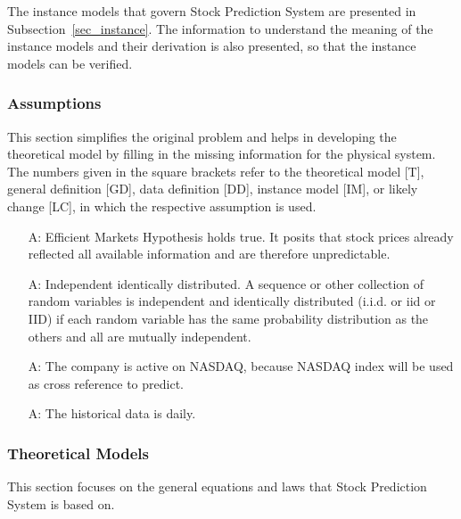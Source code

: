 \documentclass[12pt]{article}
\newcounter{assumpnum} %
\newcommand{\progname}{Stock Prediction System} %
\begin{document}
The instance models that govern \progname{} are presented in
Subsection~\ref{sec_instance}. The information to understand the meaning of the
instance models and their derivation is also presented, so that the instance
models can be verified.

\subsubsection{Assumptions}

This section simplifies the original problem and helps in developing the
theoretical model by filling in the missing information for the physical
system. The numbers given in the square brackets refer to the theoretical model
[T], general definition [GD], data definition [DD], instance model [IM], or
likely change [LC], in which the respective assumption is used.

\begin{itemize}

\item[A\refstepcounter{assumpnum}\theassumpnum \label{Ass1}:]
Efficient Markets Hypothesis holds true. It posits that stock prices already reflected all available information and are therefore unpredictable. 

\item[A\refstepcounter{assumpnum}\theassumpnum \label{Ass2}:]
Independent identically distributed. A sequence or other collection of random variables is independent and identically distributed (i.i.d. or iid or IID) if each random variable has the same probability distribution as the others and all are mutually independent.

\item[A\refstepcounter{assumpnum}\theassumpnum \label{Ass3}:]
The company is active on NASDAQ, because NASDAQ index will be used as cross reference to predict.

\item[A\refstepcounter{assumpnum}\theassumpnum \label{Ass4}:]
The historical data is daily.

\end{itemize}

\subsubsection{Theoretical Models}\label{sec_theoretical}

This section focuses on the general equations and laws that \progname{} is based
on. 
\end{document}
